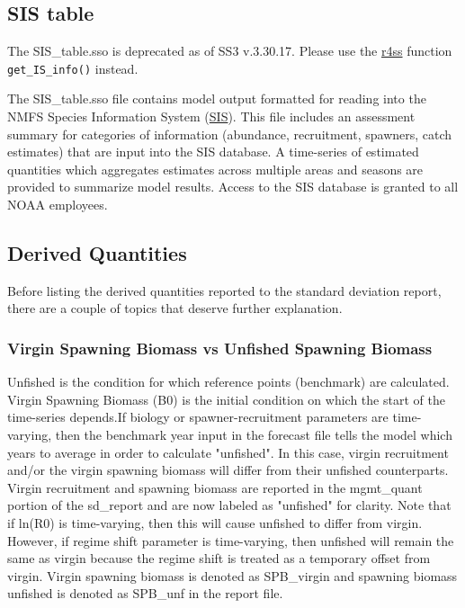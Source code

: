 \subsection{SIS table}
The SIS\_table.sso is deprecated as of SS3 v.3.30.17. Please use the \hyperlink{r4ss}{r4ss} function \texttt{get\_IS\_info()} instead. 

The SIS\_table.sso file contains model output formatted for reading into the NMFS Species Information System (\href{https://www.st.nmfs.noaa.gov/sis/}{SIS}). This file includes an assessment summary for categories of information (abundance, recruitment, spawners, catch estimates) that are input into the SIS database. A time-series of estimated quantities which aggregates estimates across multiple areas and seasons are provided to summarize model results. Access to the SIS database is granted to all NOAA employees.

\subsection{Derived Quantities}
Before listing the derived quantities reported to the standard deviation report, there are a couple of topics that deserve further explanation.

\hypertarget{VirginUnfished}{}
\subsubsection{Virgin Spawning Biomass vs Unfished Spawning Biomass}
Unfished is the condition for which reference points (benchmark) are calculated.  Virgin Spawning Biomass (B0) is the initial condition on which the start of the time-series depends.If biology or spawner-recruitment parameters are time-varying, then the benchmark year input in the forecast file tells the model which years to average in order to calculate "unfished". In this case, virgin recruitment and/or the virgin spawning biomass will differ from their unfished counterparts. Virgin recruitment and spawning biomass are reported in the mgmt\_quant portion of the sd\_report and are now labeled as "unfished" for clarity.  Note that if ln(R0) is time-varying, then this will cause unfished to differ from virgin. However, if regime shift parameter is time-varying, then unfished will remain the same as virgin because the regime shift is treated as a temporary offset from virgin. Virgin spawning biomass is denoted as SPB\_virgin and spawning biomass unfished is denoted as SPB\_unf in the report file.

